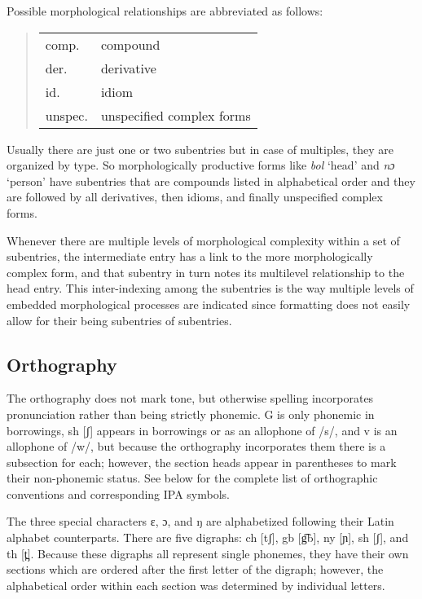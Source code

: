 Possible morphological relationships are abbreviated as follows:

\begin{quote}
    \begin{tabular}{ll}
    \small comp. & compound\\
der. & derivative\\
id. & idiom\\
unspec. & unspecified complex forms\\
\end{tabular}
\end{quote}

Usually there are just one or two subentries but in case of multiples, they are organized by type. So morphologically productive forms like \textit{bol} ‘head’ and \textit{nɔ} ‘person’ have subentries that are compounds listed in alphabetical order and they are followed by all derivatives, then idioms, and finally unspecified complex forms. 

Whenever there are multiple levels of morphological complexity within a set of subentries, the intermediate entry has a link to the more morphologically complex form, and that subentry in turn notes its multilevel relationship to the head entry. This inter-indexing among the subentries is the way multiple levels of embedded morphological processes are indicated since formatting does not easily allow for their being subentries of subentries. 

\subsection{Orthography}
The orthography does not mark tone, but otherwise spelling incorporates pronunciation rather than being strictly phonemic. G is only phonemic in borrowings,  sh [ʃ] appears in borrowings or as an allophone of /s/, and v is an allophone of /w/, but because the orthography incorporates them there is a subsection for each; however, the section heads appear in parentheses to mark their non-phonemic status. See below for the complete list of orthographic conventions and corresponding IPA symbols. 

The three special characters ɛ, ɔ, and ŋ are alphabetized following their Latin alphabet counterparts. There are five digraphs: ch [tʃ], gb [g͡b], ny [ɲ], sh [ʃ], and th [t̪]. Because these digraphs all represent single phonemes, they have their own sections which are ordered after the first letter of the digraph; however, the alphabetical order within each section was determined by individual letters.

